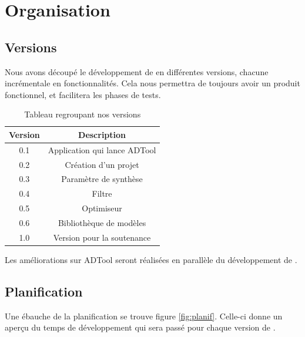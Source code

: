 \section{Organisation}

	\subsection{Versions}
		Nous avons découpé le développement de \glasir{} en différentes versions, chacune incrémentale en fonctionnalités.
		Cela nous permettra de toujours avoir un produit fonctionnel, et facilitera les phases de tests.

		\begin{table}[h!]
			\begin{center}
			\begin{tabular}{|c|c|}
				\hline
				Version & Description\\
				\hline
				0.1 & Application qui lance ADTool\\
				\hline
				0.2 & Création d'un projet\\
				\hline
				0.3 & Paramètre de synthèse\\
				\hline
				0.4 & Filtre\\
				\hline
				0.5 & Optimiseur\\
				\hline
				0.6 & Bibliothèque de modèles\\
				\hline
				1.0 & Version pour la soutenance\\
				\hline
			\end{tabular}
			\end{center}
			\caption{Tableau regroupant nos versions}
		\end{table} %

		Les améliorations sur ADTool seront réalisées en parallèle du développement de \glasir{}.

	\subsection{Planification}
		Une ébauche de la planification se trouve figure \ref{fig:planif}. Celle-ci donne un aperçu du temps de développement qui sera passé pour chaque version de \glasir{}. 

